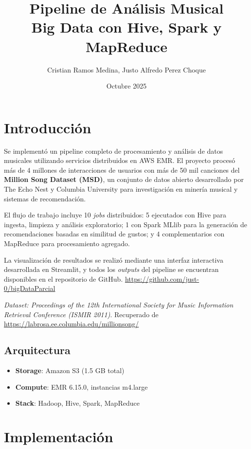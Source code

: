 \documentclass[11pt,a4paper]{article}
\title{\textbf{Pipeline de Análisis Musical} \\ \large{Big Data con Hive, Spark y MapReduce}}
\author{Cristian Ramos Medina, Justo Alfredo Perez Choque}
\date{Octubre 2025}
\begin{document}
\maketitle

\section{Introducción}
Se implementó un pipeline completo de procesamiento y análisis de datos musicales utilizando servicios distribuidos en AWS EMR. El proyecto procesó más de 4 millones de interacciones de usuarios con más de 50 mil canciones del \textbf{Million Song Dataset (MSD)}, un conjunto de datos abierto desarrollado por The Echo Nest y Columbia University para investigación en minería musical y sistemas de recomendación. 

El flujo de trabajo incluye 10 \textit{jobs} distribuidos: 5 ejecutados con Hive para ingesta, limpieza y análisis exploratorio; 1 con Spark MLlib para la generación de recomendaciones basadas en similitud de gustos; y 4 complementarios con MapReduce para procesamiento agregado. 

La visualización de resultados se realizó mediante una interfaz interactiva desarrollada en Streamlit, y todos los \textit{outputs} del pipeline se encuentran disponibles en el repositorio de GitHub.  
\href{https://github.com/just-0/bigDataParcial}{https://github.com/just-0/bigDataParcial}

\textit{Dataset: Proceedings of the 12th International Society for Music Information Retrieval Conference (ISMIR 2011)}.  
Recuperado de \href{https://labrosa.ee.columbia.edu/millionsong/}{https://labrosa.ee.columbia.edu/millionsong/}


\subsection{Arquitectura}
\begin{itemize}
    \item \textbf{Storage}: Amazon S3 (1.5 GB total)
    \item \textbf{Compute}: EMR 6.15.0, instancias m4.large
    \item \textbf{Stack}: Hadoop, Hive, Spark, MapReduce	
\end{itemize}

\section{Implementación}
\end{document}

